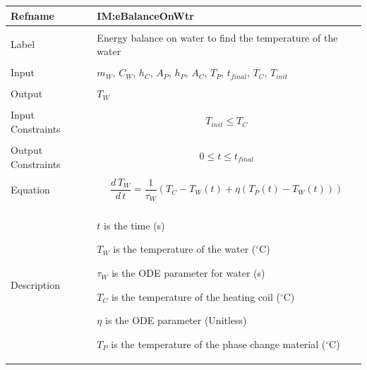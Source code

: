 \documentclass[12pt]{article}
\begin{document}
\noindent \begin{minipage}{\textwidth}
\begin{tabular}{p{} p{}}
\toprule \textbf{Refname} & \textbf{IM:eBalanceOnWtr}
\label{IM:eBalanceOnWtr}
\\ \midrule \\
Label & Energy balance on water to find the temperature of the water
\\ \midrule \\
Input & ${m_{W}}$, ${C_{W}}$, ${h_{C}}$, ${A_{P}}$, ${h_{P}}$, ${A_{C}}$, ${T_{P}}$, ${t_{final}}$, ${T_{C}}$, ${T_{init}}$
\\ \midrule \\
Output & ${T_{W}}$
\\ \midrule \\
Input Constraints & \begin{displaymath}
                    {T_{init}}\leq{}{T_{C}}
                    \end{displaymath}
\\ \midrule \\
Output Constraints & \begin{displaymath}
                     0\leq{}t\leq{}{t_{final}}
                     \end{displaymath}
\\ \midrule \\
Equation & \begin{displaymath}
           \frac{d\,{T_{W}}}{d\,t}=\frac{1}{{τ_{W}}} \left({T_{C}}-{T_{W}}\left(t\right)+η \left({T_{P}}\left(t\right)-{T_{W}}\left(t\right)\right)\right)
           \end{displaymath}
\\ \midrule \\
Description & \begin{symbDescription}
              \item{$t$ is the time (s)}
              \item{${T_{W}}$ is the temperature of the water (${}^{\circ}$C)}
              \item{${τ_{W}}$ is the ODE parameter for water (s)}
              \item{${T_{C}}$ is the temperature of the heating coil (${}^{\circ}$C)}
              \item{$η$ is the ODE parameter (Unitless)}
              \item{${T_{P}}$ is the temperature of the phase change material (${}^{\circ}$C)}
              \end{symbDescription}

\end{tabular}
\end{minipage}
\end{document}
